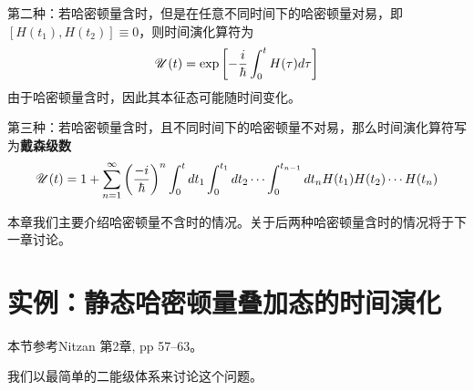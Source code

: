 第二种：若哈密顿量含时，但是在任意不同时间下的哈密顿量对易，即$ [H(t_1),H(t_2)]\equiv0 $，则时间演化算符为
\begin{equation}\label{key}
\mathscr{U}(t)=\exp\left[-\dfrac{i}{\hbar}\int_0^t H(\tau)d\tau\right]
\end{equation}
由于哈密顿量含时，因此其本征态可能随时间变化。

第三种：若哈密顿量含时，且不同时间下的哈密顿量不对易，那么时间演化算符写为\textbf{戴森级数}
\begin{equation}\label{key}
\mathscr{U}(t)=1+\sum_{n=1}^\infty\left(\dfrac{-i}{\hbar}\right)^n\int_0^tdt_1\int_0^{t_1}dt_2\cdots\int_0^{t_{n-1}}dt_n H(t_1)H(t_2)\cdots H(t_n)
\end{equation}

本章我们主要介绍哈密顿量不含时的情况。关于后两种哈密顿量含时的情况将于下一章讨论。

\section{实例：静态哈密顿量叠加态的时间演化}
\begin{framed}
本节参考Nitzan 第2章, pp 57--63。	
\end{framed}

我们以最简单的二能级体系来讨论这个问题。

